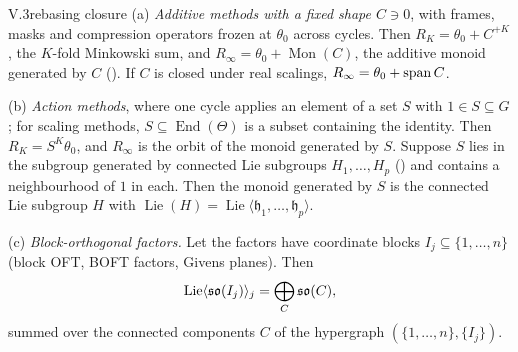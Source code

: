 \begin{theorem}{V.3}{rebasing closure}
(a) \emph{Additive methods with a fixed shape $C\ni0$}, with frames, masks and compression operators frozen at
$\theta_0$ across cycles. Then $R_K=\theta_0+C^{+K}$, the $K$-fold Minkowski sum, and
$R_\infty=\theta_0+\operatorname{Mon}(C)$, the additive monoid generated by $C$ (). If $C$ is closed under
real scalings, $R_\infty=\theta_0+\operatorname{span} C$.

(b) \emph{Action methods}, where one cycle applies an element of a set $S$ with $1\in S\subseteq G$; for scaling
methods, $S\subseteq\operatorname{End}(\Theta)$ is a subset containing the identity. Then $R_K=S^K\theta_0$, and
$R_\infty$ is the orbit of the monoid generated by $S$. Suppose $S$ lies in the subgroup generated by connected Lie
subgroups $H_1,\dots,H_p$ () and contains a neighbourhood of $1$ in each. Then the monoid generated by $S$ is
the connected Lie subgroup $H$ with $\operatorname{Lie}(H)=\operatorname{Lie}\langle\mathfrak h_1,\dots,\mathfrak
h_p\rangle$.

(c) \emph{Block-orthogonal factors.} Let the factors have coordinate blocks $I_j\subseteq\{1,\dots,n\}$ (block OFT,
BOFT factors, Givens planes). Then
\[\operatorname{Lie}\langle\mathfrak{so}(I_j)\rangle_j=\bigoplus_C\mathfrak{so}(C),\]
summed over the connected components $C$ of the hypergraph $(\{1,\dots,n\},\{I_j\})$.


\end{theorem}
